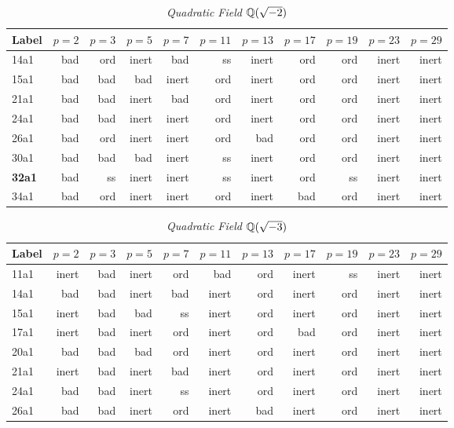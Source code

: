 \documentclass[a4paper,11pt]{article}
\numberwithin{equation}{section}
\begin{document}
\begin{table}[H]	\caption{\label{table:ordinary}\emph{Quadratic Field $\mathbb{Q}(\sqrt{-2})$}}
\begin{tabular}[t]{lrrrrrrrrrr}
	\toprule
Label   &  $p=2$ & $p=3$ & $p=5$ & $p=7$ & $p=11$ & $p=13$ & $p=17$ & $p=19$ & $p=23$ & $p=29$

\\ \midrule 14a1&bad &ord&inert&bad &ss&inert&ord&ord&inert&inert\\ \midrule 15a1&bad &bad &bad &inert&ord&inert&ord&ord&inert&inert\\ \midrule 21a1&bad &bad &inert&bad &ord&inert&ord&ord&inert&inert\\ \midrule 24a1&bad &bad &inert&inert&ord&inert&ord&ord&inert&inert\\ \midrule 26a1&bad &ord&inert&inert&ord&bad &ord&ord&inert&inert\\ \midrule 30a1&bad &bad &bad &inert&ss&inert&ord&ord&inert&inert\\ \midrule \textbf{32a1}&bad &ss&inert&inert&ss&inert&ord&ss&inert&inert\\ \midrule 34a1&bad &ord&inert&inert&ord&inert&bad &ord&inert&inert

\\
\bottomrule
\end{tabular}
\end{table}

\begin{table}[H]	\caption{\label{table:ordinary}\emph{Quadratic Field $\mathbb{Q}(\sqrt{-3})$}}
\begin{tabular}[t]{lrrrrrrrrrr}
	\toprule
Label   &  $p=2$ & $p=3$ & $p=5$ & $p=7$ & $p=11$ & $p=13$ & $p=17$ & $p=19$ & $p=23$ & $p=29$

\\ \midrule 11a1&inert&bad &inert&ord&bad &ord&inert&ss&inert&inert\\ \midrule 14a1&bad &bad &inert&bad &inert&ord&inert&ord&inert&inert\\ \midrule 15a1&inert&bad &bad &ss&inert&ord&inert&ord&inert&inert\\ \midrule 17a1&inert&bad &inert&ord&inert&ord&bad &ord&inert&inert\\ \midrule 20a1&bad &bad &bad &ord&inert&ord&inert&ord&inert&inert\\ \midrule 21a1&inert&bad &inert&bad &inert&ord&inert&ord&inert&inert\\ \midrule 24a1&bad &bad &inert&ss&inert&ord&inert&ord&inert&inert\\ \midrule 26a1&bad &bad &inert&ord&inert&bad &inert&ord&inert&inert

\\
\bottomrule
\end{tabular}
\end{table}
\end{document}
